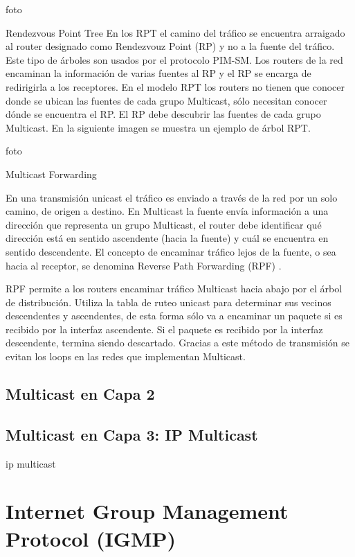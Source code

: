 \documentclass[12pt,a4paper,oneside]{book}
\begin{document}
foto

Rendezvous Point Tree	
	En los RPT el camino del tráfico se encuentra arraigado al router designado como Rendezvouz Point (RP) y no a la fuente del tráfico. Este tipo de árboles son usados por el protocolo PIM-SM. Los routers de la red encaminan la información de varias fuentes al RP y el RP se encarga de redirigirla a los receptores. En el modelo RPT los routers no tienen que conocer donde se ubican las fuentes de cada grupo Multicast, sólo necesitan conocer dónde se encuentra el RP. El RP debe descubrir las fuentes de cada grupo Multicast. En la siguiente imagen se muestra un ejemplo de árbol RPT.

foto

Multicast Forwarding 

En una transmisión unicast el tráfico es enviado a través de la red por un solo camino, de origen a destino. En Multicast la fuente envía información a una dirección que representa un grupo Multicast, el router debe identificar qué dirección está en sentido ascendente (hacia la fuente) y cuál se encuentra en sentido descendente. El concepto de encaminar tráfico lejos de la fuente, o sea hacia al receptor, se denomina Reverse Path Forwarding (RPF) .

	RPF permite a los routers encaminar tráfico Multicast hacia abajo por el árbol de distribución. Utiliza la tabla de ruteo unicast para determinar sus vecinos descendentes y ascendentes, de esta forma sólo va a encaminar un paquete si es recibido por la interfaz ascendente. Si el paquete es recibido por la interfaz descendente, termina siendo descartado. Gracias a este método de transmisión se evitan los loops en las redes que implementan Multicast.






\subsection{Multicast en Capa 2}
\label{mcast_l2}


\subsection{Multicast en Capa 3: IP Multicast}
\label{mcast_l3}
ip multicast


\section{Internet Group Management Protocol (IGMP)}
\end{document}
